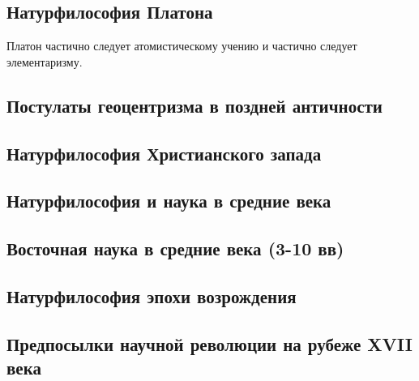 \documentclass[main.tex]{subfiles}
\begin{document}


\subsection{Натурфилософия Платона}


Платон частично следует атомистическому учению и частично следует элементаризму.

\subsection{Постулаты геоцентризма в поздней античности}


\subsection{Натурфилософия Христианского запада}


\subsection{Натурфилософия и наука в средние века}




\subsection{Восточная наука в средние века (3-10 вв)}


\subsection{Натурфилософия эпохи возрождения}


\subsection{Предпосылки научной революции на рубеже XVII века}

\end{document}
